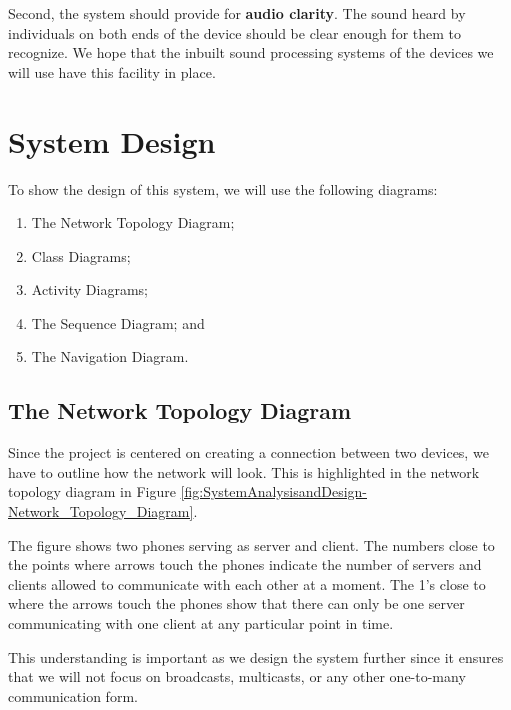\documentclass[12pt,svgnames,smaller]{article} %
\begin{document}
	Second, the system should provide for \textbf{audio clarity}. The sound heard by individuals on both ends of the device should be clear enough for them to recognize. We hope that the inbuilt sound processing systems of the devices we will use have this facility in place.
	
	

	
	\section{\textbf{System Design}}

	To show the design of this system, we will use the following diagrams:
	
	\begin{enumerate}
		\item The Network Topology Diagram;
		\item Class Diagrams; 
		\item Activity Diagrams; 
		\item The Sequence Diagram; and
		\item The Navigation Diagram.
	\end{enumerate}
	
	\subsection{The Network Topology Diagram}
	
	Since the project is centered on creating a connection between two devices, we have to outline how the network will look. This is highlighted in the network topology diagram in Figure \ref{fig:SystemAnalysisandDesign-Network_Topology_Diagram}. 

	The figure shows two phones serving as server and client. The numbers close to the points where arrows touch the phones indicate the number of servers and clients allowed to communicate with each other at a moment. The 1's close to where the arrows touch the phones show that there can only be one server communicating with one client at any particular point in time. 
	
	This understanding is important as we design the system further since it ensures that we will not focus on broadcasts, multicasts, or any other one-to-many communication form.
	
\end{document}
